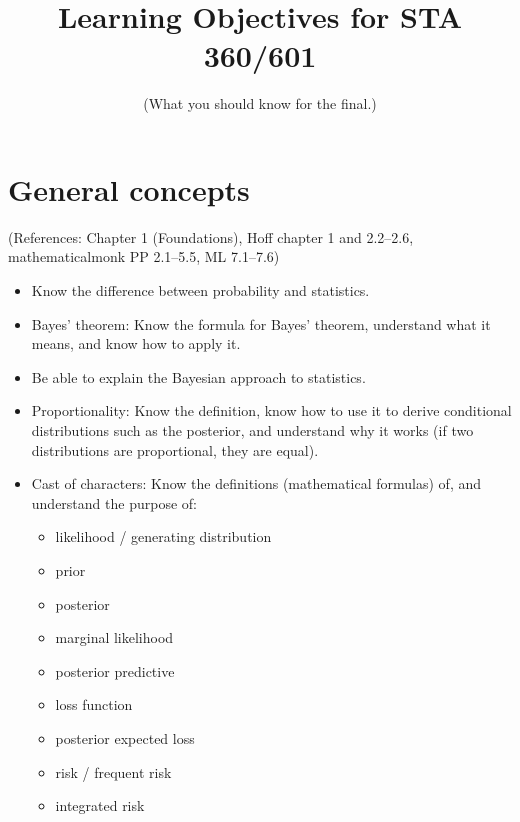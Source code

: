 \documentclass[12pt]{article}
\title{Learning Objectives for STA 360/601}
\author{(What you should know for the final.)}
\date{}
\begin{document}
\maketitle

\section{General concepts}
(References: Chapter 1 (Foundations), Hoff chapter 1 and 2.2--2.6, mathematicalmonk PP 2.1--5.5, ML 7.1--7.6)
\begin{itemize}
\setlength\itemsep{0em}
\item Know the difference between probability and statistics.
\item Bayes' theorem: Know the formula for Bayes' theorem, understand what it means, and know how to apply it.
\item Be able to explain the Bayesian approach to statistics.
\item Proportionality: Know the definition, know how to use it to derive conditional distributions such as the posterior, and understand why it works (if two distributions are proportional, they are equal).
\item Cast of characters: Know the definitions (mathematical formulas) of, and understand the purpose of:
\begin{itemize}
\item likelihood / generating distribution
\item prior
\item posterior
\item marginal likelihood
\item posterior predictive
\item loss function
\item posterior expected loss
\item risk / frequent risk
\item integrated risk
\end{itemize}
\end{itemize}
\end{document}
